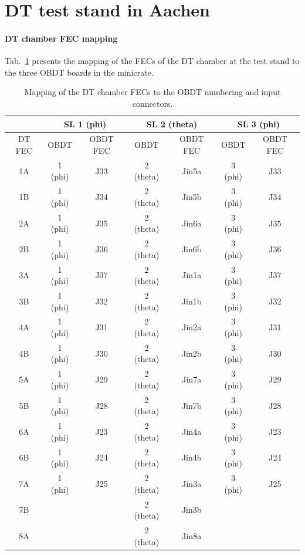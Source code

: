 \FloatBarrier
\section{DT test stand in Aachen}

\FloatBarrier
\paragraph{DT chamber FEC mapping}
Tab.\ \ref{tab:MB1Minicrate-FECMapping} presents the mapping of the \acfp{FEC} of the \ac{DT} chamber at the test stand to the three \ac{OBDT} boards in the minicrate.
\begin{table}[htb]
    \centering
    \begin{tabular}{|c|c|c|c|c|c|c|} 
        \hline
        & \multicolumn{2}{c|}{\ac{SL} 1 (phi)} & \multicolumn{2}{c|}{\ac{SL} 2 (theta)} & \multicolumn{2}{c|}{\ac{SL} 3 (phi)} \\ \hline
        \ac{DT} \ac{FEC} & \ac{OBDT} & \ac{OBDT} \ac{FEC} & \ac{OBDT} & \ac{OBDT} \ac{FEC} & \ac{OBDT} & \ac{OBDT} \ac{FEC}\\ \hline
        1A & 1 (phi) & J33 & 2 (theta) & Jin5a & 3 (phi) & J33 \\
        1B & 1 (phi) & J34 & 2 (theta) & Jin5b & 3 (phi) & J34 \\
        2A & 1 (phi) & J35 & 2 (theta) & Jin6a & 3 (phi) & J35 \\
        2B & 1 (phi) & J36 & 2 (theta) & Jin6b & 3 (phi) & J36 \\
        3A & 1 (phi) & J37 & 2 (theta) & Jin1a & 3 (phi) & J37 \\
        3B & 1 (phi) & J32 & 2 (theta) & Jin1b & 3 (phi) & J32 \\
        4A & 1 (phi) & J31 & 2 (theta) & Jin2a & 3 (phi) & J31 \\
        4B & 1 (phi) & J30 & 2 (theta) & Jin2b & 3 (phi) & J30 \\
        5A & 1 (phi) & J29 & 2 (theta) & Jin7a & 3 (phi) & J29 \\
        5B & 1 (phi) & J28 & 2 (theta) & Jin7b & 3 (phi) & J28 \\
        6A & 1 (phi) & J23 & 2 (theta) & Jin4a & 3 (phi) & J23 \\
        6B & 1 (phi) & J24 & 2 (theta) & Jin4b & 3 (phi) & J24 \\
        7A & 1 (phi) & J25 & 2 (theta) & Jin3a & 3 (phi) & J25 \\
        7B &         &     & 2 (theta) & Jin3b &         &     \\
        8A &         &     & 2 (theta) & Jin8a &         &     \\ \hline
    \end{tabular}
    \caption{Mapping of the \ac{DT} chamber \acp{FEC} to the \ac{OBDT} numbering and input connectors.}
    \label{tab:MB1Minicrate-FECMapping}
\end{table}


